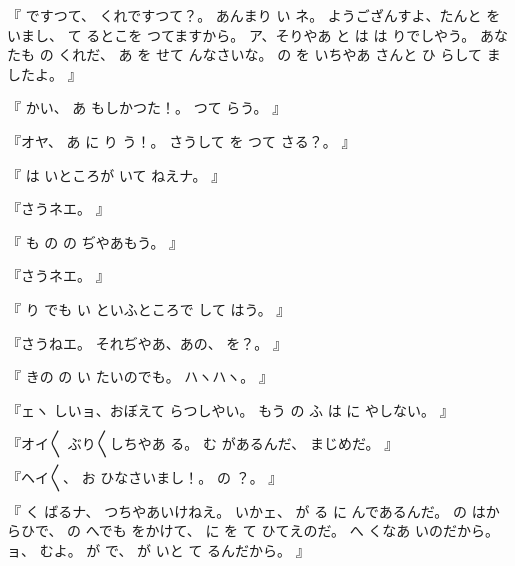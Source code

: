 『
ですつて、
くれですつて？。
あんまり
い
ネ。
ようござんすよ、たんと
を
いまし、
て
るとこを
つてますから。
ア、そりやあ
と
は
は
りでしやう。
あなたも
の
くれだ、
あ
を
せて
んなさいな。
の
を
いちやあ
さんと
ひ
らして
ましたよ。
』

『
かい、
あ
もしかつた！。
つて
らう。
』

『オヤ、
あ
に
り
う！。
さうして
を
つて
さる？。
』

『
は
いところが
いて
ねえナ。
』

『さうネエ。
』

『
も
の
の
ぢやあもう。
』

『さうネエ。
』

『
り
でも
い
といふところで
して
はう。
』

『さうねエ。
それぢやあ、あの、
を？。
』

『
きの
の
い
たいのでも。
ハヽハヽ。
』

『ェヽ
しいョ、おぼえて
らつしやい。
もう
の
ふ
は
に
やしない。
』

『オイ〳〵
ぶり〳〵しちやあ
る。
む
があるんだ、
まじめだ。
』

『ヘイ〳〵、
お
ひなさいまし！。
の
？。
』

『
く
ばるナ、
つちやあいけねえ。
いかェ、
が
る
に
んであるんだ。
の
はからひで、
の
へでも
をかけて、
に
を
て
ひてえのだ。
へ
くなあ
いのだから。
ョ、
むよ。
が
で、
が
いと
て
るんだから。
』

